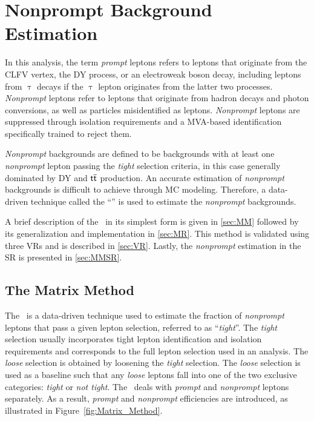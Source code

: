 \chapter{Nonprompt Background Estimation}
\label{chap:Nonprompt}

In this analysis, the term \emph{prompt} leptons refers to leptons that originate from the \ac{CLFV} vertex, the \ac{DY} process, or an electroweak boson decay, including leptons from $\uptau$ decays if the $\uptau$ lepton originates from the latter two processes. \emph{Nonprompt} leptons refer to leptons that originate from hadron decays and photon conversions, as well as particles misidentified as leptons. \emph{Nonprompt} leptons are suppressed through isolation requirements and a \ac{MVA}-based identification specifically trained to reject them.

\emph{Nonprompt} backgrounds are defined to be backgrounds with at least one \emph{nonprompt} lepton passing the \emph{tight} selection criteria, in this case generally dominated by \ac{DY} and $\textsf{t}\overline{\textsf{t}}$ production. An accurate estimation of \emph{nonprompt} backgrounds is difficult to achieve through \ac{MC} modeling. Therefore, a data-driven technique called the ``\mm'' \cite{Gillam:2014xua} is used to estimate the \emph{nonprompt} backgrounds. 

A brief description of the \mm~in its simplest form is given in \autoref{sec:MM} followed by its generalization and implementation in \autoref{sec:MR}. This method is validated using three \acp{VR} and is described in \autoref{sec:VR}. Lastly, the \emph{nonprompt} estimation in the \ac{SR} is presented in \autoref{sec:MMSR}.

\section{The Matrix Method}
\label{sec:MM}

The \mm~is a data-driven technique used to estimate the fraction of \emph{nonprompt} leptons that pass a given lepton selection, referred to as ``\emph{tight}''. The \emph{tight} selection usually incorporates tight lepton identification and isolation requirements and corresponds to the full lepton selection used in an analysis. The \emph{loose} selection is obtained by loosening the \emph{tight} selection. The \emph{loose} selection is used as a baseline such that any \emph{loose} leptons fall into one of the two exclusive categories: \emph{tight} or \emph{not tight}. The \mm~deals with \emph{prompt} and \emph{nonprompt} leptons separately. As a result, \emph{prompt} and \emph{nonprompt} efficiencies are introduced, as illustrated in Figure~\ref{fig:Matrix_Method}.

